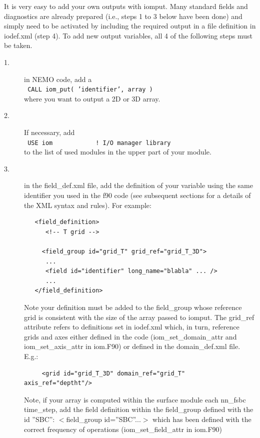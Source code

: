 It is very easy to add your own outputs with iomput. Many standard fields and diagnostics are already prepared (i.e., steps 1 to 3 below have been done) and simply need to be activated by including the required output in a file definition in iodef.xml (step 4). To add new output variables, all 4 of the following steps must be taken.
\begin{description}
\item[1.] in NEMO code, add a \\
\texttt{      CALL iom\_put( 'identifier', array ) } \\
where you want to output a 2D or 3D array.

\item[2.] If necessary, add \\
\texttt{   USE iom\ \ \ \ \ \ \ \ \ \ \ \ ! I/O manager library }  \\
to the list of used modules in the upper part of your module. 

\item[3.] in the field\_def.xml file, add the definition of your variable using the same identifier you used in the f90 code (see subsequent sections for a details of the XML syntax and rules). For example:
\vspace{-20pt}
\begin{alltt}  {{\scriptsize
\begin{verbatim}
   <field_definition>
      <!-- T grid -->

     <field_group id="grid_T" grid_ref="grid_T_3D">
      ...
      <field id="identifier" long_name="blabla" ... />   
      ...
   </field_definition> 
\end{verbatim}
}}\end{alltt} 
Note your definition must be added to the field\_group whose reference grid is consistent with the size of the array passed to iomput. The grid\_ref attribute refers to definitions set in iodef.xml which, in turn, reference grids and axes either defined in the code (iom\_set\_domain\_attr and iom\_set\_axis\_attr in iom.F90) or defined in the domain\_def.xml file. E.g.:
\vspace{-20pt}
\begin{alltt}  {{\scriptsize
\begin{verbatim}
     <grid id="grid_T_3D" domain_ref="grid_T" axis_ref="deptht"/>
\end{verbatim}
}}\end{alltt} 
Note, if your array is computed within the surface module each nn\_fsbc time\_step, 
add the field definition within the field\_group defined with the id ''SBC'': $<$field\_group id=''SBC''...$>$ which has been defined with the correct frequency of operations (iom\_set\_field\_attr in iom.F90)


\end{description}
